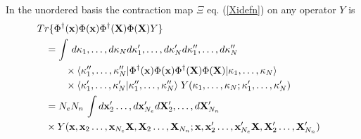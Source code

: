 In the unordered basis the contraction map $\Xi $ eq. (\ref{Xidefn}) on any
operator $Y$ is 
\begin{align}
& \!\!\!\!\!Tr\{\Phi ^{\dagger }({\bf x})\Phi ({\bf x})\Phi ^{\dagger }({\bf %
X})\Phi ({\bf X})Y\}  \nonumber \\
& =\int \,d\kappa _{1},\ldots ,d\kappa _{N}d\kappa _{1}^{\prime },\ldots
,d\kappa _{N}^{\prime }d\kappa _{1}^{\prime \prime },\ldots ,d\kappa
_{N}^{\prime \prime }  \nonumber \\
& \qquad \times \langle \kappa _{1}^{\prime \prime },\ldots ,\kappa
_{N}^{\prime \prime }|\Phi ^{\dagger }({\bf x})\Phi ({\bf x})\Phi ^{\dagger
}({\bf X})\Phi ({\bf X})|\kappa _{1},\ldots ,\kappa _{N}\rangle  \nonumber \\
& \qquad \times \langle \kappa _{1}^{\prime },\ldots ,\kappa _{N}^{\prime
}|\kappa _{1}^{\prime \prime },\ldots ,\kappa _{N}^{\prime \prime }\rangle
\;Y(\kappa _{1},\ldots ,\kappa _{N};\kappa _{1}^{\prime },\ldots ,\kappa
_{N}^{\prime })  \nonumber \\
& =N_{e}N_{n}\,\int d{\bf x}_{2}^{\prime }\ldots ,d{\bf x}_{N_{e}}^{\prime }d%
{\bf X}_{2}^{\prime },\ldots ,d{\bf X}_{N_{n}}^{\prime }  \nonumber \\
& \times Y({\bf x},{\bf x}_{2}\ldots ,{\bf x}_{N_{e}}{\bf X},{\bf X}%
_{2}\ldots ,{\bf X}_{N_{n}};{\bf x},{\bf x}_{2}^{\prime }\ldots ,{\bf x}%
_{N_{e}}^{\prime }{\bf X},{\bf X}_{2}^{\prime }\ldots ,{\bf X}%
_{N_{n}}^{\prime })  \label{TrphiphiphiphiY}
\end{align}

